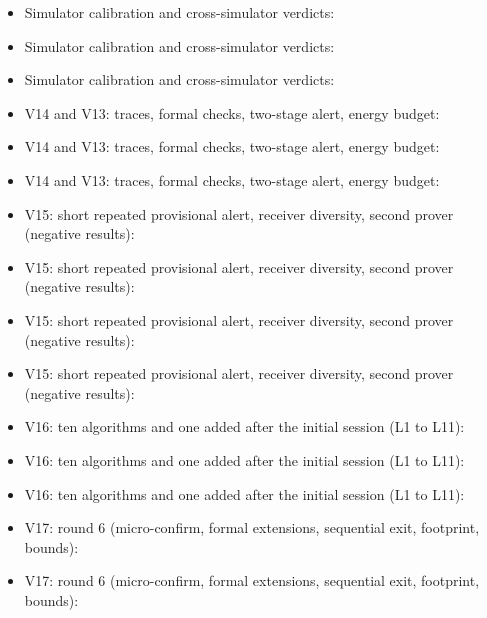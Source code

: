 \documentclass[10pt,a4paper]{article}
\begin{document}
{\begin{itemize}
\item Simulator calibration and cross-simulator verdicts: 
\item Simulator calibration and cross-simulator verdicts: 
\item Simulator calibration and cross-simulator verdicts: 
\item V14 and V13: traces, formal checks, two-stage alert, energy budget: 
\item V14 and V13: traces, formal checks, two-stage alert, energy budget: 
\item V14 and V13: traces, formal checks, two-stage alert, energy budget: 
\item V15: short repeated provisional alert, receiver diversity, second prover (negative results): 
\item V15: short repeated provisional alert, receiver diversity, second prover (negative results): 
\item V15: short repeated provisional alert, receiver diversity, second prover (negative results): 
\item V15: short repeated provisional alert, receiver diversity, second prover (negative results): 
\item V16: ten algorithms and one added after the initial session (L1 to L11): 
\item V16: ten algorithms and one added after the initial session (L1 to L11): 
\item V16: ten algorithms and one added after the initial session (L1 to L11): 
\item V17: round 6 (micro-confirm, formal extensions, sequential exit, footprint, bounds): 
\item V17: round 6 (micro-confirm, formal extensions, sequential exit, footprint, bounds): 

\end{itemize}}
\end{document}
